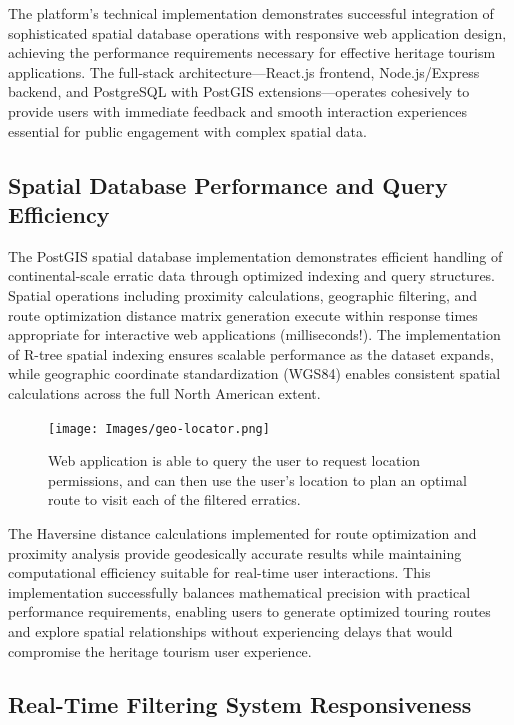 The platform's technical implementation demonstrates successful integration of sophisticated spatial database operations with responsive web application design, achieving the performance requirements necessary for effective heritage tourism applications. The full-stack architecture—React.js frontend, Node.js/Express backend, and PostgreSQL with PostGIS extensions—operates cohesively to provide users with immediate feedback and smooth interaction experiences essential for public engagement with complex spatial data.

\subsection{Spatial Database Performance and Query Efficiency}
\label{subsec:spatial_database_performance}

The PostGIS spatial database implementation demonstrates efficient handling of continental-scale erratic data through optimized indexing and query structures. Spatial operations including proximity calculations, geographic filtering, and route optimization distance matrix generation execute within response times appropriate for interactive web applications (milliseconds!). The implementation of R-tree spatial indexing ensures scalable performance as the dataset expands, while geographic coordinate standardization (WGS84) enables consistent spatial calculations across the full North American extent.

\begin{figure}[htbp]
    \centering
    \texttt{[image: Images/geo-locator.png]}
    \caption{Web application is able to query the user to request location permissions, and can then use the user's location to plan an optimal route to visit each of the filtered erratics.}
    \label{fig:database_performance_metrics}
\end{figure}

The Haversine distance calculations implemented for route optimization and proximity analysis provide geodesically accurate results while maintaining computational efficiency suitable for real-time user interactions. This implementation successfully balances mathematical precision with practical performance requirements, enabling users to generate optimized touring routes and explore spatial relationships without experiencing delays that would compromise the heritage tourism user experience.

\subsection{Real-Time Filtering System Responsiveness}
\label{subsec:filtering_responsiveness}


